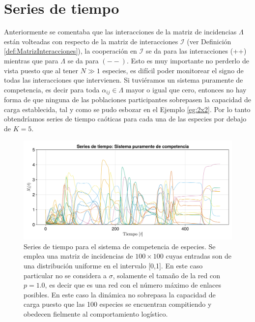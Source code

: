 \section{Series de tiempo}
Anteriormente se comentaba que las interacciones de la matriz de incidencias $\Lambda$ están volteadas con respecto de la matriz de interacciones $\mathcal{I}$ (ver Definición \ref{def:MatrizInteracciones}), la cooperación en $\mathcal{I}$ se da para las interacciones (++) mientras que para $\Lambda$ se da para $(--)$. Esto es muy importante no perderlo de vista puesto que al tener $N\gg 1$ especies, es difícil poder monitorear el signo de todas las interacciones que intervienen. Si tuviéramos un sistema puramente de competencia, es decir para toda $\alpha_{ij}\in\Lambda$ mayor o igual que cero, entonces no hay forma de que ninguna de las poblaciones participantes sobrepasen la capacidad de carga establecida, tal y como se pudo esbozar en el Ejemplo \ref{eg:2x2}. Por lo tanto obtendríamos series de tiempo caóticas para cada una de las especies por debajo de $K=5$.
\begin{figure}[h!]
	\centering
	\includegraphics[scale=0.23]{../Imagenes/Seriesdetiempopositiva}
	\caption{Series de tiempo para el sistema de competencia de especies. Se emplea una matriz de incidencias de $100\times 100$ cuyas entradas son de una distribución uniforme en el intervalo [0,1]. En este caso particular no se considera a $\sigma$, solamente el tamaño de la red con $p=1.0$, es decir que es una red con el número máximo de enlaces posibles. En este caso la dinámica no sobrepasa la capacidad de carga puesto que las 100 especies se encuentran compitiendo y obedecen fielmente al comportamiento logístico.}
	\label{fig:Seriesdetiempopostiva}
\end{figure}

